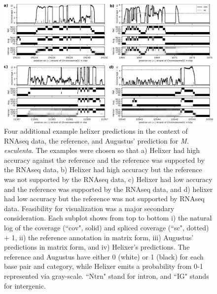 \documentclass{article}
\renewcommand{\thefigure}{S\arabic{figure}}
\begin{document}
\begin{figure}[!h]
\label{supfig:cov_example_02}

\centerline{\includegraphics[width=\textwidth]{images/cov_examples/cov_example_002}}
\caption{
Four additional example helixer predictions in the context of RNAseq data, the reference,
and Augustus' prediction for {\it M. esculenta}. The examples were chosen so
that a) Helixer had high accuracy against the reference and the reference
was supported by the RNAseq data, b) Helixer had high accuracy but the
reference was not supported by the RNAseq data, c) Helixer had low accuracy
and the reference was supported by the RNAseq data, and d) helixer had low
accuracy but the reference was not supported by RNAseq data. Feasibility for visualization was
a major secondary consideration. Each subplot shows from top to
bottom i) the natural log of the coverage (``cov", solid) and spliced coverage
(``sc", dotted) + 1, ii) the reference annotation in matrix form, iii)
Augustus' predictions in matrix form, and iv) Helixer's predictions. The reference
and Augustus have either 0 (white) or 1 (black) for each base pair and category, while
Helixer emits a probability from 0-1 represented via gray-scale. ``Ntrn" stand
for intron, and ``IG" stands for intergenic.
}
\end{figure}
\end{document}

